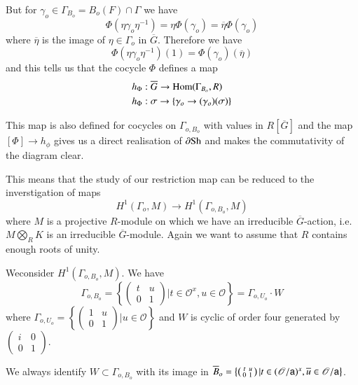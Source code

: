 But for $\gamma_{o}\in \Gamma_{B_{o}}=B_{o}(F)\cap \Gamma$ we have
$$
\Phi(\eta\gamma_{o}\eta^{-1})=\eta\Phi(\gamma_{o})=\overline{\eta}\Phi(\gamma_{o})
$$
where $\overline{\eta}$ is the image of $\eta\in \Gamma_{o}$ in $\overline{G}$. Therefore we have
$$
\Phi(\eta\gamma_{o}\eta^{-1})(1)=\Phi(\gamma_{o})(\overline{\eta})
$$
and this tells us that the cocycle $\Phi$ defines a map
\begin{align*}
& h_{\Phi}:\overline{G}\to \operatorname{Hom}(\Gamma_{B_{o}},R)\\
& h_{\Phi}:\sigma\to \{\gamma_{o}\to (\gamma_{o})(\sigma)\}
\end{align*}

This map is also defined for cocycles on $\Gamma_{o,B_{o}}$ with values in $R[\overline{G}]$ and the map $[\Phi]\to h_{\phi}$ gives us a direct realisation of $\partial \mathrm{Sh}$ and makes the commutativity of the diagram clear.

This means that the study of our restriction map can be reduced to the inverstigation of maps
$$
H^{1}(\Gamma_{o},M)\to H^{1}(\Gamma_{o,B_{o}},M)
$$
where $M$ is a projective $R$-module on which we have an irreducible $\overline{G}$-action, i.e. $M\bigotimes\limits_{R}K$ is an irreducible $\overline{G}$-module. Again we want to assume that $R$ contains enough roots of unity.

We\pageoriginale consider $H^{1}(\Gamma_{o,B_{o}},M)$. We have
$$
\Gamma_{o,B_{o}}=\left\{\left(\begin{matrix} t & u\\ 0 & 1\end{matrix}\right)|t\in \mathscr{O}^{x},u\in \mathscr{O}\right\}=\Gamma_{o,U_{o}}\cdot W
$$
where $\Gamma_{o,U_{o}}=\left\{\left(\begin{smallmatrix} 1 & u\\ 0 & 1\end{smallmatrix}\right)|u\in \mathscr{O}\right\}$ and $W$ is cyclic of order four generated by $\left(\begin{smallmatrix} i & 0\\ 0 & 1\end{smallmatrix}\right)$.

We always identify $W\subset \Gamma_{o,B_{o}}$ with its image in $\overline{B}_{o}=\left\{\left(\begin{smallmatrix} t & u\\ 0 & 1\end{smallmatrix}\right) | t\in (\mathscr{O}/\mathsf{a})^{x}, \overline{u}\in \mathscr{O}/\mathsf{a}\right\}$.

